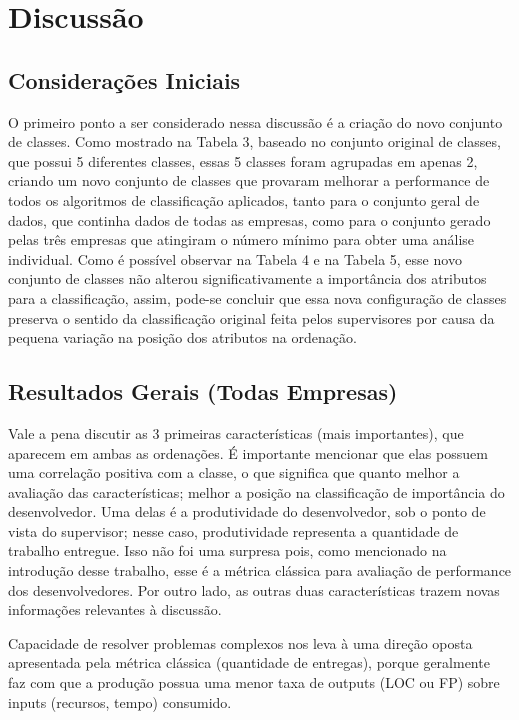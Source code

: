 \chapter[Discussão]{Discussão}

\section{Considerações Iniciais}
O primeiro ponto a ser considerado nessa discussão é a criação do novo conjunto de classes. Como mostrado na Tabela 3, baseado no conjunto original de classes, que possui 5 diferentes classes, essas 5 classes foram agrupadas em apenas 2, criando um novo conjunto de classes que provaram melhorar a performance de todos os algoritmos de classificação aplicados, tanto para o conjunto geral de dados, que continha dados de todas as empresas, como para o conjunto gerado pelas três empresas que atingiram o número mínimo para obter uma análise individual. Como é possível observar na Tabela 4 e na Tabela 5, esse novo conjunto de classes não alterou significativamente a importância dos atributos para a classificação, assim, pode-se concluir que essa nova configuração de classes preserva o sentido da classificação original feita pelos supervisores por causa da pequena variação na posição dos atributos na ordenação.
\section{Resultados Gerais (Todas Empresas)}
Vale a pena discutir as 3 primeiras características (mais importantes), que aparecem em ambas as ordenações. É importante mencionar que elas possuem uma correlação positiva com a classe, o que significa que quanto melhor a avaliação das características; melhor a posição na classificação de importância do desenvolvedor. Uma delas é a produtividade do desenvolvedor, sob o ponto de vista do supervisor; nesse caso, produtividade representa a quantidade de trabalho entregue. Isso não foi uma surpresa pois, como mencionado na introdução desse trabalho, esse é a métrica clássica para avaliação de performance dos desenvolvedores. Por outro lado, as outras duas características trazem novas informações relevantes à discussão.

Capacidade de resolver problemas complexos nos leva à uma direção oposta apresentada pela métrica clássica (quantidade de entregas), porque geralmente faz com que a produção possua uma menor taxa de outputs (LOC ou FP) sobre inputs (recursos, tempo) consumido.

